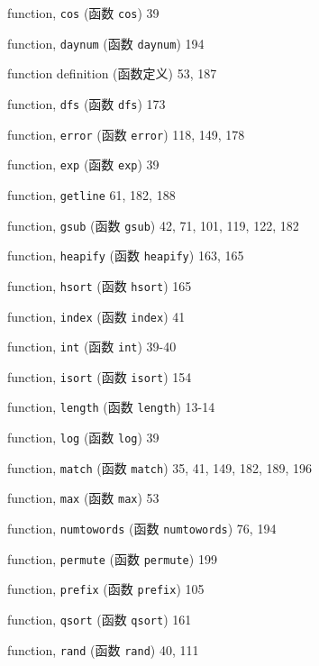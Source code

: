 \begin{multicols}{2}
\hangindent=2pc  function, \verb'cos' (函数 \verb'cos') 39

\hangindent=2pc  function, \verb'daynum' (函数 \verb'daynum') 194

\hangindent=2pc  function definition (函数定义) 53, 187

\hangindent=2pc  function, \verb'dfs' (函数 \verb'dfs') 173

\hangindent=2pc  function, \verb'error' (函数 \verb'error')
118, 149, 178

\hangindent=2pc  function, \verb'exp' (函数 \verb'exp') 39

\hangindent=2pc  function, \verb'getline' 61, 182, 188

\hangindent=2pc  function, \verb'gsub' (函数 \verb'gsub')
42, 71, 101, 119, 122, 182

\hangindent=2pc  function, \verb'heapify' (函数 \verb'heapify')
163, 165

\hangindent=2pc  function, \verb'hsort' (函数 \verb'hsort') 165

\hangindent=2pc  function, \verb'index' (函数 \verb'index') 41

\hangindent=2pc  function, \verb'int' (函数 \verb'int') 39-40

\hangindent=2pc  function, \verb'isort' (函数 \verb'isort') 154

\hangindent=2pc  function, \verb'length' (函数 \verb'length') 13-14

\hangindent=2pc  function, \verb'log' (函数 \verb'log') 39

\hangindent=2pc  function, \verb'match' (函数 \verb'match')
35, 41, 149, 182, 189, 196

\hangindent=2pc  function, \verb'max' (函数 \verb'max') 53

\hangindent=2pc  function, \verb'numtowords' (函数
\verb'numtowords') 76, 194

\hangindent=2pc  function, \verb'permute' (函数 \verb'permute') 199

\hangindent=2pc  function, \verb'prefix' (函数 \verb'prefix') 105

\hangindent=2pc  function, \verb'qsort' (函数 \verb'qsort') 161

\hangindent=2pc  function, \verb'rand' (函数 \verb'rand') 40, 111


\end{multicols}
